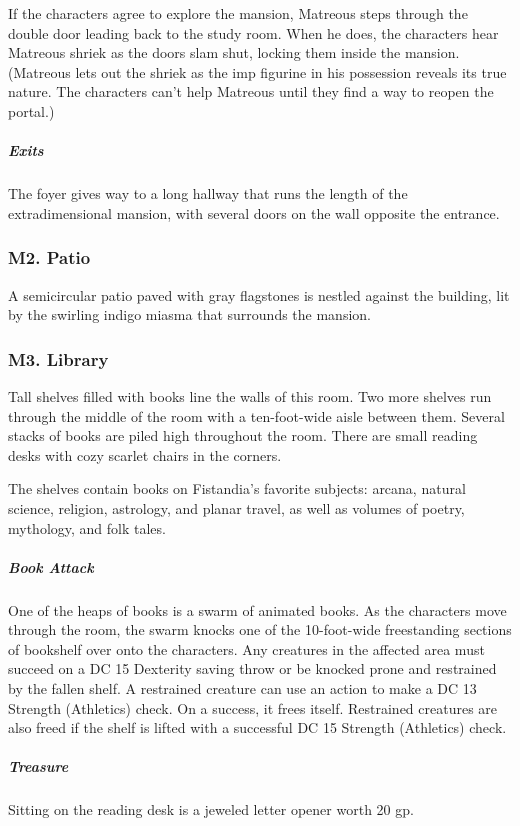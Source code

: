 \documentclass[10pt,a4paper,twoside,bg=print,twocolumn,openany,nodeprecatedcode]{dndbook}
\begin{document}
If the characters agree to explore the mansion, Matreous steps through the double door leading back to the study room. When he does, the characters hear Matreous shriek as the doors slam shut, locking them inside the mansion. (Matreous lets out the shriek as the imp figurine in his possession reveals its true nature. The characters can't help Matreous until they find a way to reopen the portal.)

\subparagraph{Exits}
The foyer gives way to a long hallway that runs the length of the extradimensional mansion, with several doors on the wall opposite the entrance.

\subsubsection{M2. Patio}
A semicircular patio paved with gray flagstones is nestled against the building, lit by the swirling indigo miasma that surrounds the mansion.

\subsubsection{M3. Library}
\begin{DndReadAloud}{}
Tall shelves filled with books line the walls of this room. Two more shelves run through the middle of the room with a ten-foot-wide aisle between them. Several stacks of books are piled high throughout the room. There are small reading desks with cozy scarlet chairs in the corners.

\end{DndReadAloud}

The shelves contain books on Fistandia's favorite subjects: arcana, natural science, religion, astrology, and planar travel, as well as volumes of poetry, mythology, and folk tales.

\subparagraph{Book Attack}
One of the heaps of books is a swarm of animated books. As the characters move through the room, the swarm knocks one of the 10-foot-wide freestanding sections of bookshelf over onto the characters. Any creatures in the affected area must succeed on a DC 15 Dexterity saving throw or be knocked prone and restrained by the fallen shelf. A restrained creature can use an action to make a DC 13 Strength (Athletics) check. On a success, it frees itself. Restrained creatures are also freed if the shelf is lifted with a successful DC 15 Strength (Athletics) check.

\subparagraph{Treasure}
Sitting on the reading desk is a jeweled letter opener worth 20 gp.
\end{document}
